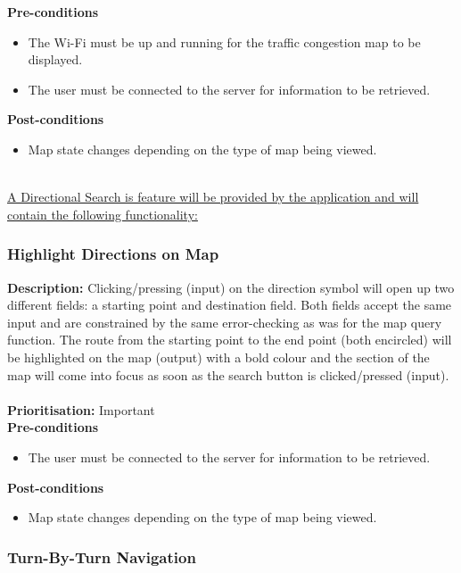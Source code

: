 \documentclass[runningheads,a4paper]{article}
\begin{document}
  
\textbf{Pre-conditions}
\begin{itemize}
 	\item The Wi-Fi must be up and running for the traffic congestion map to be displayed.
	\item The user must be connected to the server for information to be retrieved.
\end{itemize}
  
\textbf{Post-conditions}
\begin{itemize}
  	\item Map state changes depending on the type of map being viewed.
\end{itemize}



\noindent \\ \underline{A Directional Search is feature will be provided by the application and will contain the following functionality:}


\subsubsection{Highlight Directions on Map}

\textbf{Description:}  Clicking/pressing (input) on the direction symbol will open up two different fields: a starting point and destination field. Both fields accept the same input and are constrained by the same error-checking as was for the map query function.
The route from the starting point to the end point (both encircled) will be highlighted on the map (output) with a bold colour and the section of the map will come into focus as soon as the search button is clicked/pressed (input).\\\\
\noindent
\textbf{Prioritisation:} Important\\
  
  
\textbf{Pre-conditions}
\begin{itemize}
	\item The user must be connected to the server for information to be retrieved.
\end{itemize}
  
\textbf{Post-conditions}
\begin{itemize}
  	\item Map state changes depending on the type of map being viewed.
\end{itemize}

\subsubsection{Turn-By-Turn Navigation}
\end{document}
